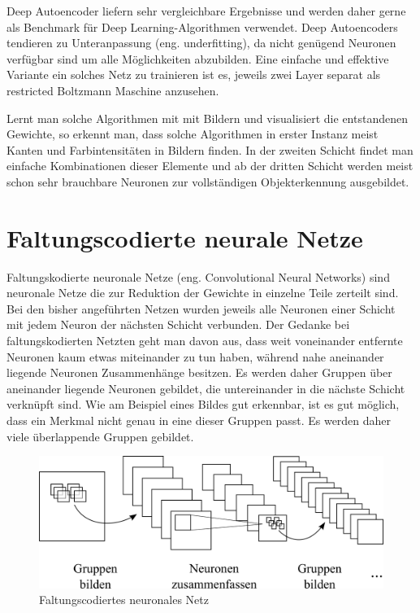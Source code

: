Deep Autoencoder liefern sehr vergleichbare Ergebnisse und werden daher gerne als Benchmark für Deep Learning-Algorithmen verwendet. Deep Autoencoders tendieren zu Unteranpassung (eng. underfitting), da nicht genügend Neuronen verfügbar sind um alle Möglichkeiten abzubilden. Eine einfache und effektive Variante ein solches Netz zu trainieren ist es, jeweils zwei Layer separat als restricted Boltzmann Maschine anzusehen.

Lernt man solche Algorithmen mit mit Bildern und visualisiert die entstandenen Gewichte, so erkennt man, dass solche Algorithmen in erster Instanz meist Kanten und Farbintensitäten in Bildern finden. In der zweiten Schicht findet man einfache Kombinationen dieser Elemente und ab der dritten Schicht werden meist schon sehr brauchbare Neuronen zur vollständigen Objekterkennung ausgebildet.

\section{Faltungscodierte neurale Netze}

Faltungskodierte neuronale Netze (eng. Convolutional Neural Networks) sind neuronale Netze die zur Reduktion der Gewichte in einzelne Teile zerteilt sind. Bei den bisher angeführten Netzen wurden jeweils alle Neuronen einer Schicht mit jedem Neuron der nächsten Schicht verbunden. Der Gedanke bei faltungskodierten Netzten geht man davon aus, dass weit voneinander entfernte Neuronen kaum etwas miteinander zu tun haben, während nahe aneinander liegende Neuronen Zusammenhänge besitzen. Es werden daher Gruppen über aneinander liegende Neuronen gebildet, die untereinander in die nächste Schicht verknüpft sind. Wie am Beispiel eines Bildes gut erkennbar, ist es gut möglich, dass ein Merkmal nicht genau in eine dieser Gruppen passt. Es werden daher viele überlappende Gruppen gebildet.

\begin{figure}
	\centering
	\includegraphics[scale=1]{images/convolution.png}
	\caption{Faltungscodiertes neuronales Netz}
	\label{fig:convolution}
\end{figure}

